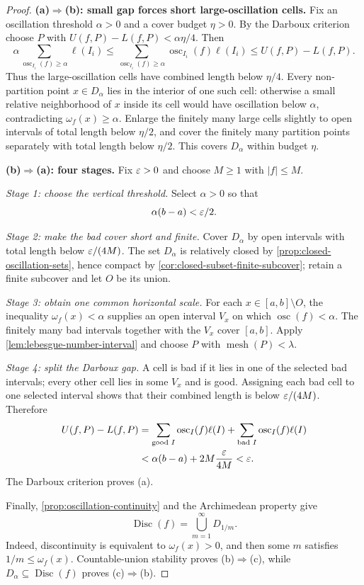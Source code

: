 \begin{proof}
\textbf{(a)$\Rightarrow$(b): small gap forces short large-oscillation
cells.} Fix an oscillation threshold $\alpha>0$ and a cover budget
$\eta>0$. By the Darboux criterion choose $P$ with
$U(f,P)-L(f,P)<\alpha\eta/4$. Then
\[
\alpha\sum_{\operatorname{osc}_{I_i}(f)\geq\alpha}\ell(I_i)
\leq\sum_{\operatorname{osc}_{I_i}(f)\geq\alpha}
\operatorname{osc}_{I_i}(f)\ell(I_i)
\leq U(f,P)-L(f,P).
\]
Thus the large-oscillation cells have combined length below $\eta/4$.
Every non-partition point $x\in D_\alpha$ lies in the interior of one such
cell: otherwise a small relative neighborhood of $x$ inside its cell would
have oscillation below $\alpha$, contradicting
$\omega_f(x)\geq\alpha$. Enlarge the finitely many large cells slightly to
open intervals of total length below $\eta/2$, and cover the finitely many
partition points separately with total length below $\eta/2$. This covers
$D_\alpha$ within budget $\eta$.

\textbf{(b)$\Rightarrow$(a): four stages.} Fix $\varepsilon>0$ and choose
$M\geq1$ with $|f|\leq M$.

\emph{Stage 1: choose the vertical threshold.} Select $\alpha>0$ so that
\[
\alpha(b-a)<\varepsilon/2.
\]

\emph{Stage 2: make the bad cover short and finite.} Cover $D_\alpha$ by
open intervals with total length below $\varepsilon/(4M)$. The set $D_\alpha$ is
relatively closed by \cref{prop:closed-oscillation-sets}, hence compact by
\cref{cor:closed-subset-finite-subcover}; retain a finite subcover and let
$O$ be its union.

\emph{Stage 3: obtain one common horizontal scale.} For each
$x\in[a,b]\setminus O$, the inequality $\omega_f(x)<\alpha$ supplies an
open interval $V_x$ on which $\operatorname{osc}(f)<\alpha$. The finitely
many bad intervals together with the $V_x$ cover $[a,b]$. Apply
\cref{lem:lebesgue-number-interval} and choose $P$ with
$\operatorname{mesh}(P)<\lambda$.

\emph{Stage 4: split the Darboux gap.} A cell is bad if it lies in one of
the selected bad intervals; every other cell lies in some $V_x$ and is
good. Assigning each bad cell to one selected interval shows that their
combined length is below $\varepsilon/(4M)$. Therefore
\[
\begin{aligned}
U(f,P)-L(f,P)
&=\sum_{\text{good }I}\operatorname{osc}_I(f)\ell(I)
 +\sum_{\text{bad }I}\operatorname{osc}_I(f)\ell(I)\\
&<\alpha(b-a)+2M\frac{\varepsilon}{4M}<\varepsilon.
\end{aligned}
\]
The Darboux criterion proves (a).

Finally, \cref{prop:oscillation-continuity} and the Archimedean property
give
\[
\operatorname{Disc}(f)=\bigcup_{m=1}^\infty D_{1/m}.
\]
Indeed, discontinuity is equivalent to $\omega_f(x)>0$, and then some
$m$ satisfies $1/m\leq\omega_f(x)$. Countable-union stability proves
(b)$\Rightarrow$(c), while $D_\alpha\subseteq\operatorname{Disc}(f)$
proves (c)$\Rightarrow$(b).
\end{proof}

